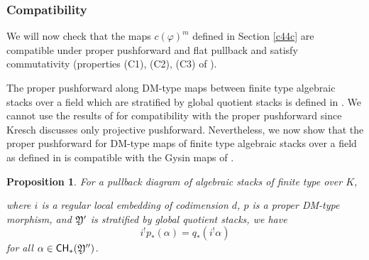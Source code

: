 \documentclass[a4paper,12pt]{article} %
\theoremstyle{definition}
\theoremstyle{plain}%
\newtheorem{proposition}[definition]{Proposition}
\renewcommand{\phi}{\varphi}
\newcommand{\Chow}{\mathsf{CH}}
\newcommand{\jocomment}[1]{}
\begin{document}
\subsubsection{Compatibility} \label{c45c}
We will now check that the maps $c(\phi)^{m}$ 
defined in Section \ref{c44c} are
 compatible under proper pushforward and flat pullback and satisfy commutativity (properties (C1), (C2), (C3) of \cite[Section 17.1]{Fulton1984Intersection-th}).


The proper pushforward along DM-type maps between finite type algebraic stacks over a field which are stratified by global quotient stacks is defined in  \cite[Appendix B]{BaeSchmitt1}.  We cannot use the results of \cite{Kresch1999Cycle-groups-fo} for  compatibility with the proper  pushforward
since Kresch discusses only projective pushforward. 
Nevertheless, we now show that the proper pushforward for DM-type maps of finite type algebraic stacks over a field as defined in \cite[Appendix B]{BaeSchmitt1} is compatible with the Gysin maps of \cite{Kresch1999Cycle-groups-fo}.


\begin{proposition}\label{prop:Gysinproperpush}
 For a pullback diagram of algebraic stacks of finite type over $K$,
 \begin{center}
 \end{center}
 where $i$ is a regular local embedding of codimension $d$, $p$ is a proper DM-type morphism, and $\frak Y'$ is stratified by global quotient stacks, we have 
 \[i^!p_*(\alpha) = q_* (i^! \alpha)\]
 for all  $\alpha \in \Chow_*(\frak Y'')$.
\end{proposition}
\end{document}
